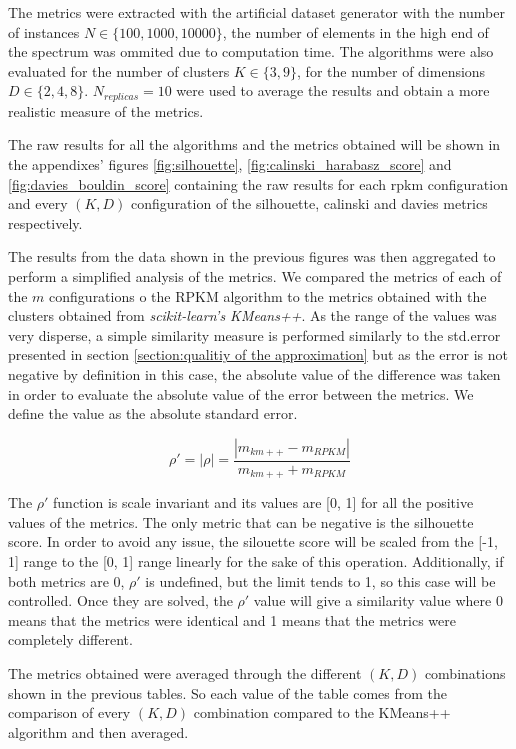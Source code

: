 The metrics were extracted with the artificial dataset generator with the number of instances $N \in \{100, 1000, 10000\}$, the number of elements in the high end of the spectrum was ommited due to computation time. The algorithms were also evaluated for the number of clusters $K \in \{3, 9\}$, for the number of dimensions $D \in \{2, 4, 8\}$. $N_{replicas}=10$ were used to average the results and obtain a more realistic measure of the metrics.

The raw results for all the algorithms and the metrics obtained will be shown in the appendixes' figures \ref{fig:silhouette}, \ref{fig:calinski_harabasz_score} and \ref{fig:davies_bouldin_score} containing the raw results for each rpkm configuration and every $(K, D)$ configuration of the silhouette, calinski and davies metrics respectively.


The results from the data shown in the previous figures was then aggregated to perform a simplified analysis of the metrics. We compared the metrics of each of the $m$ configurations o the RPKM algorithm to the metrics obtained with the clusters obtained from \textit{scikit-learn's KMeans++}. As the range of the values was very disperse, a simple similarity measure is performed similarly to the std.error presented in section \ref{section:qualitiy of the approximation} but as the error is not negative by definition in this case, the absolute value of the difference was taken in order to evaluate the absolute value of the error between the metrics. We define the value as the absolute standard error.

$$\rho' = |\rho| = \frac{|m_{km++} - m_{RPKM}|}{m_{km++} + m_{RPKM}}$$

The $\rho'$ function is scale invariant and its values are [0, 1] for all the positive values of the metrics. The only metric that can be negative is the silhouette score. In order to avoid any issue, the silouette score will be scaled from the [-1, 1] range to the [0, 1] range linearly for the sake of this operation. Additionally, if both metrics are 0, $\rho'$ is undefined, but the limit tends to 1, so this case will be controlled. Once they are solved, the $\rho'$ value will give a similarity value where 0 means that the metrics were identical and 1 means that the metrics were completely different.

The metrics obtained were averaged through the different $(K, D)$ combinations shown in the previous tables. So each value of the table comes from the comparison of every $(K, D)$ combination compared to the KMeans++ algorithm and then averaged.

